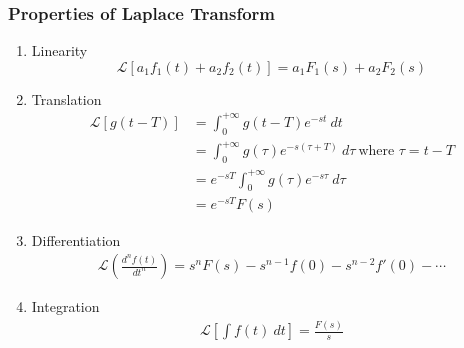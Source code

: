 \documentclass[a4paper]{article}
\begin{document}
\subsubsection{Properties of Laplace Transform}
\begin{enumerate}[label=\alph*.]
    \item Linearity
    $$\mathscr{L}[a_1f_1(t)+a_2f_2(t)] = a_1F_1(s)+a_2F_2(s)$$
    \item Translation
    \begin{align*}
        \mathscr{L}[g(t-T)] &= \int_0^{+\infty}g(t-T)e^{-st}\ dt\\
        &= \int_0^{+\infty} g(\tau)e^{-s(\tau+T)}\ d\tau \ \text{where } \tau = t-T\\
        &= e^{-sT}\int_0^{+\infty}g(\tau)e^{-s\tau}\ d\tau\\
        &= e^{-sT}F(s)
    \end{align*}
    \item Differentiation
    \begin{align*}
        \mathscr{L}\left(\frac{d^nf(t)}{dt^n}\right) = s^nF(s) - s^{n-1}f(0) - s^{n-2}f'(0) - \cdots
    \end{align*}
    \item Integration
    \begin{align*}
        \mathscr{L}\left[\int f(t)\ dt\right] = \frac{F(s)}{s}
    \end{align*}
\end{enumerate}
\end{document}

